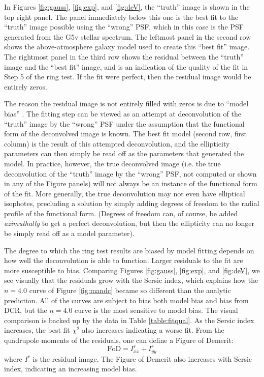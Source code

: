 \documentclass[apj]{emulateapj}
\begin{document}
In Figures \ref{fig:gauss}, \ref{fig:exp}, and \ref{fig:deV}, the
``truth'' image is shown in the top right panel.  The panel
immediately below this one is the best fit to the ``truth'' image
possible using the ``wrong'' PSF, which in this case is the PSF
generated from the G5v stellar spectrum.  The leftmost panel in the
second row shows the above-atmosphere galaxy model used to create this
``best fit'' image.  The rightmost panel in the third row shows the
residual between the ``truth'' image and the ``best fit'' image, and
is an indication of the quality of the fit in Step 5 of the ring test.
If the fit were perfect, then the residual image would be entirely
zeros.

The reason the residual image is not entirely filled with zeros is due
to ``model bias'' \citep{Melchior2009, Voigt2010, Bernstein2010}.  The
fitting step can be viewed as an attempt at deconvolution of the
``truth'' image by the ``wrong'' PSF under the assumption that the
functional form of the deconvolved image is known.  The best fit model
(second row, first column) is the result of this attempted
deconvolution, and the ellipticity parameters can then simply be read
off as the parameters that generated the model.  In practice, however,
the true deconvolved image (i.e. the true deconvolution of the
``truth'' image by the ``wrong'' PSF, not computed or shown in any of
the Figure panels) will not always be an instance of the functional
form of the fit.  More generally, the true deconvolution may not even
have elliptical isophotes, precluding a solution by simply adding
degrees of freedom to the radial profile of the functional form.
(Degrees of freedom can, of course, be added {\it azimuthally} to get
a perfect deconvolution, but then the ellipticity can no longer be
simply read off as a model parameter).

The degree to which the ring test results are biased by model fitting
depends on how well the deconvolution is able to function.  Larger
residuals to the fit are more susceptible to bias.  Comparing Figures
\ref{fig:gauss}, \ref{fig:exp}, and \ref{fig:deV}, we see visually
that the residuals grow with the Sersic index, which explains how the
$n=4.0$ curve of Figure \ref{fig:mandc} became so different than the
analytic prediction.  All of the curves are subject to bias both model
bias and bias from DCR, but the $n=4.0$ curve is the most sensitive to
model bias.  The visual comparison is backed up by the data in Table
\ref{table:fitqual}.  As the Sersic index increases, the best fit
$\chi^2$ also increases indicating a worse fit.  From the quadrupole
moments of the residuals, one can define a Figure of Demerit:
\begin{equation}
  \mathrm{FoD} = I^r_{xx} + I^r_{yy}
\end{equation}
where $I^r$ is the residual image.  The Figure of Demerit also
increases with Sersic index, indicating an increasing model bias.
\end{document}
